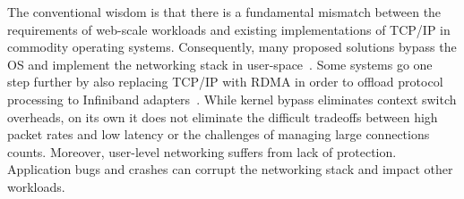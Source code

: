 
The conventional wisdom is that there is a fundamental mismatch
between the requirements of web-scale workloads and existing
implementations of TCP/IP in commodity operating
systems. Consequently, many proposed solutions bypass the OS and
implement the networking stack in
user-space~\cite{jeong2014mtcp,Kapoor:2012:CPL,openonload,marinos2013network,Thekkath:1993:INP}. Some
systems go one step further by also replacing TCP/IP with RDMA in
order to offload protocol processing to Infiniband
adapters~\cite{DBLP:conf/sosp/OngaroRSOR11,Jose:2011:MDH,mitchell:rdma,dragojevic14farm}. While
kernel bypass eliminates context switch overheads, on its own it does
not eliminate the difficult tradeoffs between high packet rates and
low latency or the challenges of managing large connections
counts. Moreover, user-level networking suffers from lack of
protection. Application bugs and crashes can corrupt the networking
stack and impact other workloads.

